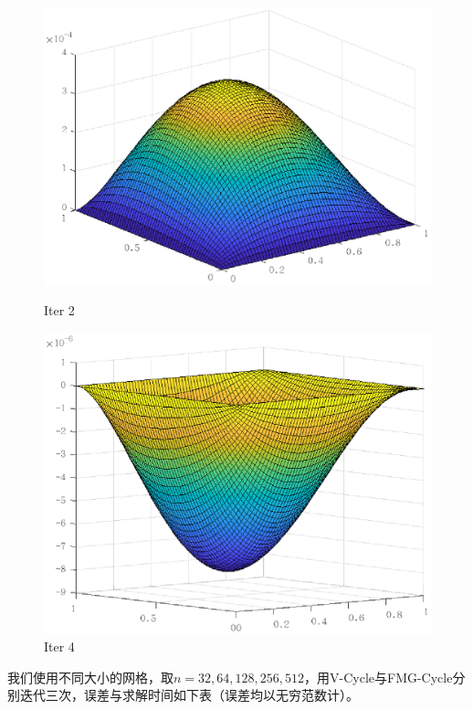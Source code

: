 \documentclass[lang=cn,10pt]{elegantbook}
\begin{document}
\begin{figure}[H]
  \centering
  \begin{minipage}[t]{0.24\linewidth}
      \centering
      \includegraphics[width=0.8\linewidth]{figure/2-4-5.eps}
      \caption*{Iter 2}
  \end{minipage}
  \begin{minipage}[t]{0.24\linewidth}
    \centering
    \includegraphics[width=0.8\linewidth]{figure/2-4-6.eps}
    \caption*{Iter 4}
\end{minipage}
\end{figure}

我们使用不同大小的网格，取$n=32,64,128,256,512$，用V-Cycle与FMG-Cycle分别迭代三次，误差与求解时间如下表（误差均以无穷范数计）。
\end{document}
